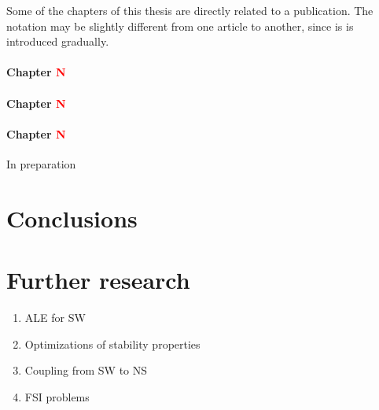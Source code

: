 Some of the chapters of this thesis are directly related to a publication. The notation may be slightly different from one article to another, since is is introduced gradually.

\paragraph{Chapter \textcolor{red}{\bfseries N}} 
\paragraph{Chapter \textcolor{red}{\bfseries N}} 
\paragraph{Chapter \textcolor{red}{\bfseries N}} In preparation




\section{Conclusions}





\section{Further research}


\begin{enumerate}
    \item ALE for SW
    \item Optimizations of stability properties
    \item Coupling from SW to NS
    \item FSI problems
\end{enumerate}

